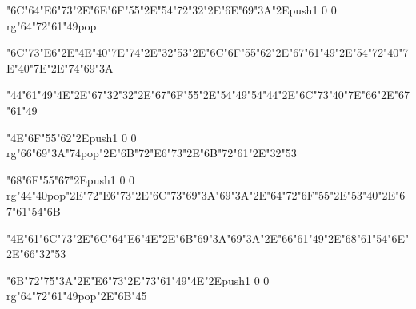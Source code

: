 \vfill\eject
\null\vfill
\centerline{\ipa\char"6C\ipa\char"64\ipa\char"E6\ipa\char"73\ipa\char"2E\ipa\char"6E\ipa\char"6F\ipa\char"55\ipa\char"2E\ipa\char"54\ipa\char"72\ipa\char"32\ipa\char"2E\ipa\char"6E\ipa\char"69\ipa\char"3A\ipa\char"2E\pdfcolorstack\match push{1 0 0 rg}\ipa\char"64\ipa\char"72\ipa\char"61\ipa\char"49\pdfcolorstack\match pop{}}\bigskip
\centerline{\ipa\char"6C\ipa\char"73\ipa\char"E6\ipa\char"2E\ipa\char"4E\ipa\char"40\ipa\char"7E\ipa\char"74\ipa\char"2E\ipa\char"32\ipa\char"53\ipa\char"2E\ipa\char"6C\ipa\char"6F\ipa\char"55\ipa\char"62\ipa\char"2E\ipa\char"67\ipa\char"61\ipa\char"49\ipa\char"2E\ipa\char"54\ipa\char"72\ipa\char"40\ipa\char"7E\ipa\char"40\ipa\char"7E\ipa\char"2E\ipa\char"74\ipa\char"69\ipa\char"3A}\bigskip
\centerline{\ipa\char"44\ipa\char"61\ipa\char"49\ipa\char"4E\ipa\char"2E\ipa\char"67\ipa\char"32\ipa\char"32\ipa\char"2E\ipa\char"67\ipa\char"6F\ipa\char"55\ipa\char"2E\ipa\char"54\ipa\char"49\ipa\char"54\ipa\char"44\ipa\char"2E\ipa\char"6C\ipa\char"73\ipa\char"40\ipa\char"7E\ipa\char"66\ipa\char"2E\ipa\char"67\ipa\char"61\ipa\char"49}
\vfill\eject
\null\vfill
\centerline{\ipa\char"4E\ipa\char"6F\ipa\char"55\ipa\char"62\ipa\char"2E\pdfcolorstack\match push{1 0 0 rg}\ipa\char"66\ipa\char"69\ipa\char"3A\ipa\char"74\pdfcolorstack\match pop{}\ipa\char"2E\ipa\char"6B\ipa\char"72\ipa\char"E6\ipa\char"73\ipa\char"2E\ipa\char"6B\ipa\char"72\ipa\char"61\ipa\char"2E\ipa\char"32\ipa\char"53}\bigskip
\centerline{\ipa\char"68\ipa\char"6F\ipa\char"55\ipa\char"67\ipa\char"2E\pdfcolorstack\match push{1 0 0 rg}\ipa\char"44\ipa\char"40\pdfcolorstack\match pop{}\ipa\char"2E\ipa\char"72\ipa\char"E6\ipa\char"73\ipa\char"2E\ipa\char"6C\ipa\char"73\ipa\char"69\ipa\char"3A\ipa\char"69\ipa\char"3A\ipa\char"2E\ipa\char"64\ipa\char"72\ipa\char"6F\ipa\char"55\ipa\char"2E\ipa\char"53\ipa\char"40\ipa\char"2E\ipa\char"67\ipa\char"61\ipa\char"54\ipa\char"6B}\bigskip
\centerline{\ipa\char"4E\ipa\char"61\ipa\char"6C\ipa\char"73\ipa\char"2E\ipa\char"6C\ipa\char"64\ipa\char"E6\ipa\char"4E\ipa\char"2E\ipa\char"6B\ipa\char"69\ipa\char"3A\ipa\char"69\ipa\char"3A\ipa\char"2E\ipa\char"66\ipa\char"61\ipa\char"49\ipa\char"2E\ipa\char"68\ipa\char"61\ipa\char"54\ipa\char"6E\ipa\char"2E\ipa\char"66\ipa\char"32\ipa\char"53}
\vfill\eject
\null\vfill
\centerline{\ipa\char"6B\ipa\char"72\ipa\char"75\ipa\char"3A\ipa\char"2E\ipa\char"E6\ipa\char"73\ipa\char"2E\ipa\char"73\ipa\char"61\ipa\char"49\ipa\char"4E\ipa\char"2E\pdfcolorstack\match push{1 0 0 rg}\ipa\char"64\ipa\char"72\ipa\char"61\ipa\char"49\pdfcolorstack\match pop{}\ipa\char"2E\ipa\char"6B\ipa\char"45}\bigskip
